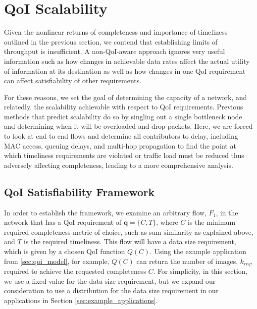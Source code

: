 \section{QoI Scalability}
\label{sec:qoi_scalability}


Given the nonlinear returns of completeness and importance of timeliness outlined in the previous section, we contend that establishing limits of throughput is insufficient.  A non-QoI-aware approach ignores very useful information such as how changes in achievable data rates affect the actual utility of information at its destination as well as how changes in one QoI requirement can affect satisfiability of other requirements.  

For these reasons, we set the goal of determining the capacity of a network, and relatedly, the scalability achievable with respect to QoI requirements.  Previous methods that predict scalability do so by singling out a single bottleneck node and determining when it will be overloaded and drop packets. Here, we are forced to look at end to end flows and determine all contributors to delay, including MAC access, queuing delays, and multi-hop propagation to find the point at which timeliness requirements are violated or traffic load must be reduced thus adversely affecting completeness, leading to a more comprehensive analysis.

\subsection{QoI Satisfiability Framework}
In order to establish the framework, we examine an arbitrary flow, $F_1$, in the network that has a QoI requirement of $\mathbf{q} = \{C, T\}$, where $C$ is the minimum required completeness metric of choice, such as sum similarity as explained above, and $T$ is the required timeliness.  This flow will have a data size requirement, which is given by a chosen QoI function $Q(C)$.  Using the example application from \ref{sec:qoi_model}, for example, $Q(C)$ can return the number of images, $k_{req}$, required to achieve the requested completeness $C$. For simplicity, in this section, we use a fixed value for the data size requirement, but we expand our consideration to use a distribution for the data size requirement in our applications in Section \ref{sec:example_applications}.

